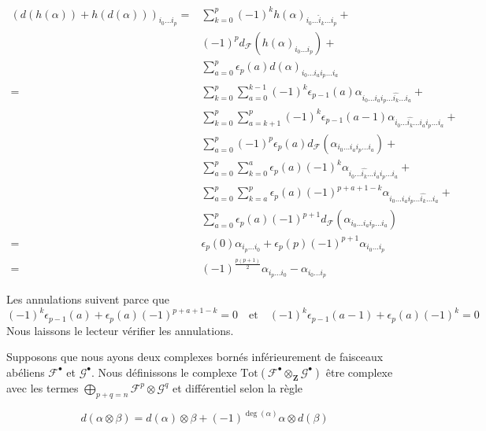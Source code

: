\begin{align*}
(d(h(\alpha)) + h(d(\alpha)))_{i_0 \ldots i_p}
= &
\sum\nolimits_{k = 0}^p
(-1)^k
h(\alpha)_{i_0 \ldots \hat i_k \ldots i_p}
+ \\
&
(-1)^p
d_{\mathcal F}(h(\alpha)_{i_0 \ldots i_p})
+ \\
&
\sum\nolimits_{a = 0}^p
\epsilon_p(a)
d(\alpha)_{i_0 \ldots i_a i_p \ldots i_a}
\\
= &
\sum\nolimits_{k = 0}^p
\sum\nolimits_{a = 0}^{k - 1}
(-1)^k \epsilon_{p - 1}(a)
\alpha_{i_0 \ldots i_a i_p \ldots \hat{i_k} \ldots i_a}
+ \\
&
\sum\nolimits_{k = 0}^p
\sum\nolimits_{a = k + 1}^p
(-1)^k \epsilon_{p - 1}(a - 1)
\alpha_{i_0 \ldots \hat{i_k} \ldots i_a i_p \ldots i_a}
+ \\
&
\sum\nolimits_{a = 0}^p
(-1)^p \epsilon_p(a)
d_{\mathcal F}(\alpha_{i_0 \ldots i_a i_p \ldots i_a})
+ \\
&
\sum\nolimits_{a = 0}^p
\sum\nolimits_{k = 0}^a
\epsilon_p(a) (-1)^k
\alpha_{i_0 \ldots \hat{i_k} \ldots i_a i_p \ldots i_a}
+ \\
&
\sum\nolimits_{a = 0}^p
\sum\nolimits_{k = a}^p
\epsilon_p(a) (-1)^{p + a + 1 - k}
\alpha_{i_0 \ldots i_a i_p \ldots \hat{i_k} \ldots i_a}
+ \\
&
\sum\nolimits_{a = 0}^p
\epsilon_p(a) (-1)^{p + 1}
d_{\mathcal F}(\alpha_{i_0 \ldots i_a i_p \ldots i_a})
\\
= &
\epsilon_p(0) \alpha_{i_p \ldots i_0} +
\epsilon_p(p) (-1)^{p + 1} \alpha_{i_0 \ldots i_p} \\
= &
(-1)^{\frac{p(p + 1)}{2}}\alpha_{i_p \ldots i_0}
- \alpha_{i_0 \ldots i_p}
\end{align*}

Les annulations suivent parce que
$$
(-1)^k \epsilon_{p - 1}(a) + \epsilon_p(a)(-1)^{p + a + 1 - k} = 0
\quad\text{et}\quad
(-1)^k\epsilon_{p - 1}(a - 1) + \epsilon_p(a) (-1)^k = 0
$$
Nous laissons le lecteur vérifier les annulations.

\medskip\noindent

Supposons que nous ayons deux complexes bornés inférieurement de faisceaux abéliens
${\mathcal F}^\bullet$ et ${\mathcal G}^\bullet$. Nous définissons le complexe
$\text{Tot}({\mathcal F}^\bullet\otimes_{\mathbf Z} {\mathcal G}^\bullet)$
être complexe avec les termes
$\bigoplus_{p + q = n} {\mathcal F}^p \otimes {\mathcal G}^q$
et différentiel selon la règle

\begin{equation}
\label{equation-differential-tensor-product-complexes}
d(\alpha \otimes \beta) =
d(\alpha)\otimes \beta + (-1)^{\deg(\alpha)} \alpha \otimes d(\beta)
\end{equation}

